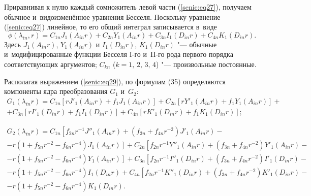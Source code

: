 Приравнивая к нулю каждый сомножитель левой части (\ref{senic:eq27}), получаем обычное и~видоизменённое уравнения Бесселя. Поскольку уравнение (\ref{senic:eq27}) линейное, то его общий интеграл записывается в~виде
\begin{equation}
\label{senic:eq29}
\phi \left( {\lambda _{in} ,r} \right) = C_{1n} J_1 \left( {A_{in} r} 
\right) + C_{2n} Y_1 \left( {A_{in} r} \right) + C_{3n} I_1 \left( {D_{in} 
r} \right) + C_{4n} K_1 \left( {D_{in} r} \right).
\end{equation}
Здесь $J_1 \left( {A_{in} r} \right)$, $Y_1 \left( {A_{in} r} \right)$ и $I_1 
\left( {D_{in} r} \right)$, $K_1 \left( {D_{in} r} \right) $ "--- обычные и~модифицированные функции 
Бесселя I-го и~II-го рода первого порядка соответствующих аргументов; 
$C_{kn}$ ($k = 1,\,2,\,3,\,4$) "--- произвольные постоянные.

Располагая выражением (\ref{senic:eq29}), по формулам (35) определяются компоненты ядра 
преобразования $G_1 $ и~$G_2 $:
\begin{multline*}
 G_1 \left( {\lambda _{in} r} \right) = C_{1n} \left[ {r{J}'_1 \left( 
{A_{in} r} \right) + f_1 J_1 \left( {A_{in} r} \right)} \right] + C_{2n} 
\left[ {r{Y}'_1 \left( {A_{in} r} \right) + f_1 Y_1 \left( {A_{in} r} 
\right)} \right] + \\ 
 + C_{3n} \left[ {r{I}'_1 \left( {D_{in} r} \right) + f_1 I_1 \left( {D_{in} 
r} \right)} \right] + C_{4n} \left[ {r{K}'_1 \left( {D_{in} r} \right) + f_1 
K_1 \left( {D_{in} r} \right)} \right]; 
 \end{multline*}

\begin{multline}
G_2 \left( {\lambda _{in} r} \right) = C_{1n} \left[ {f_{2n} r^{ - 1}} 
\right.{J}''_1 \left( {A_{in} r} \right) + \left( {f_{3n} + f_{4n} r^{ - 2}} 
\right){J}'_1 \left( {A_{in} r} \right) - 
\\
 - r\left( {1 + f_{5n} r^{ - 2} - f_{6n} r^{ - 4}} \right)J_1 \left. {\left( 
{A_{in} r} \right)} \right] + C_{2n} \left[ {f_{2n} r^{ - 1}{Y}''_1 \left( 
{A_{in} r} \right)} \right. + \left( {f_{3n} + f_{4n} r^{ - 2}} 
\right){Y}'_1 \left( {A_{in} r} \right) - 
\\
 - r\left( {1 + f_{5n} r^{ - 2} - f_{6n} r^{ - 4}} \right)\left. {Y_1 \left( 
{A_{in} r} \right)} \right] + C_{3n} \left[ {f_{2n} r^{ - 1}{I}''_1 \left( 
{D_{in} r} \right) + } \right.\left( {f_{3n} + f_{4n} r^{ - 2}} 
\right){I}'_1 \left( {D_{in} r} \right) - 
\\
 - r\left( {1 + f_{5n} r^{ - 2} - f_{6n} r^{ - 4}} \right)I_1 \left( {D_{in} 
r} \right) + C_{4n} \left[ {f_{2n} r^{ - 1}{K}''_1 \left( {D_{in} r} 
\right)} \right. + \left( {f_{3n} + f_{4n} r^{ - 2}} \right){K}'_1 \left( 
{D_{in} r} \right) - 
\\
\label{senic:eq30}
 - r\left( {1 + f_{5n} r^{ - 2} - f_{6n} r^{ - 4}} \right)K_1 \left( {D_{in} 
r} \right).
\end{multline}

